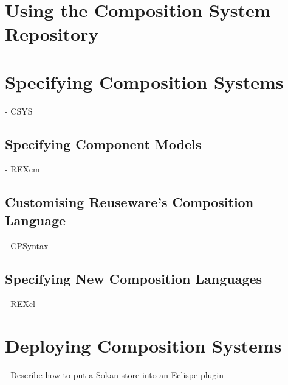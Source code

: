 \section{Using the Composition System Repository}


\section{Specifying Composition Systems}

- CSYS

\subsection{Specifying Component Models}

- REXcm

\subsection{Customising Reuseware's Composition Language}

- CPSyntax

\subsection{Specifying New Composition Languages}

- REXcl

\section{Deploying Composition Systems}

- Describe how to put a Sokan store into an Eclispe plugin